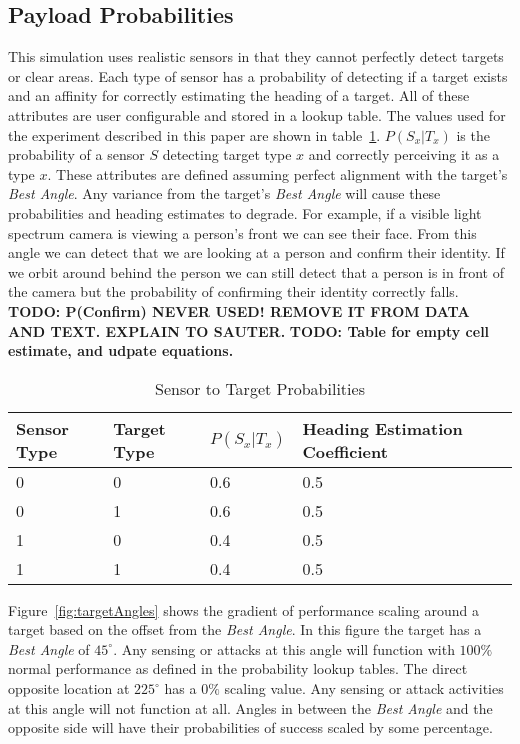 \subsection{Payload Probabilities}
\label{sec:payload_probs}
This simulation uses realistic sensors in that they cannot perfectly detect targets or clear areas.  Each type of sensor has a probability of detecting if a target exists and an affinity for correctly estimating the heading of a target.  All of these attributes are user configurable and stored in a lookup table.  The values used for the experiment described in this paper are shown in table~\ref{tab:snsrTgtProb}.  $P(S_{x}|T_{x})$ is the probability of a sensor $S$ detecting target type $x$ and correctly perceiving it as a type $x$.  These attributes are defined assuming perfect alignment with the target's \textit{Best Angle}.  Any variance from the target's \textit{Best Angle} will cause these probabilities and heading estimates to degrade.  For example, if a visible light spectrum camera is viewing a person's front we can see their face.  From this angle we can detect that we are looking at a person and confirm their identity.  If we orbit around behind the person we can still detect that a person is in front of the camera but the probability of confirming their identity correctly falls.
\textbf{TODO: P(Confirm) NEVER USED! REMOVE IT FROM DATA AND TEXT.  EXPLAIN TO SAUTER.}
\textbf{TODO: Table for empty cell estimate, and udpate equations.}
\begin{table}[H]
	\caption{Sensor to Target Probabilities}
	\centering
	\label{tab:snsrTgtProb}
	\begin{tabular}{|p{1cm}|p{1cm}|p{1cm}|p{1cm}|p{1cm}|}
		\hline
		Sensor Type & Target Type & $P(S_{x}|T_{x})$ & Heading Estimation Coefficient\\ \hline
		0 & 0 & 0.6 & 0.5 \\
		0 & 1 & 0.6 & 0.5 \\
		1 & 0 & 0.4 & 0.5 \\
		1 & 1 & 0.4 & 0.5 \\
		\hline
	\end{tabular}
\end{table}

Figure~\ref{fig:targetAngles} shows the gradient of performance scaling around a target based on the offset from the \textit{Best Angle}.  In this figure the target has a \textit{Best Angle} of $45^{\circ}$.  Any sensing or attacks at this angle will function with $100\%$ normal performance as defined in the probability lookup tables.  The direct opposite location at $225^{\circ}$ has a $0\%$ scaling value.  Any sensing or attack activities at this angle will not function at all.  Angles in between the \textit{Best Angle} and the opposite side will have their probabilities of success scaled by some percentage.

